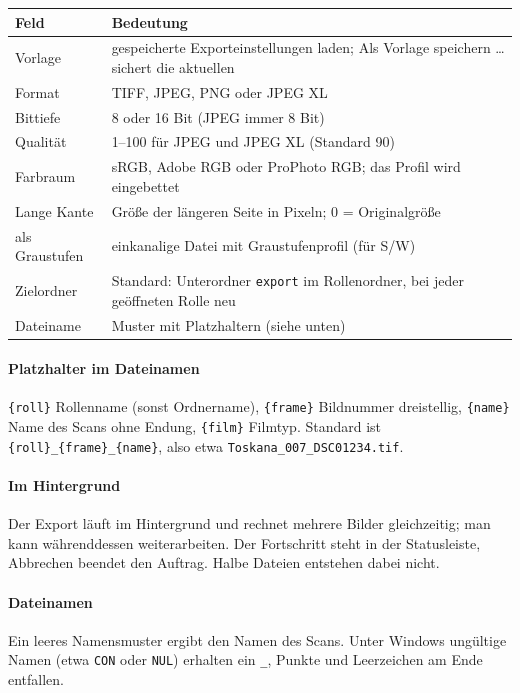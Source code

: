 \documentclass[a4paper,11pt,parskip=half,DIV=12]{scrartcl}
\newcommand{\menu}[1]{\textsf{#1}}                    %
\newcommand{\datei}[1]{\texttt{#1}}                   %
\begin{document}
\begin{center}
\begin{tabularx}{\textwidth}{@{}lX@{}}
  \toprule
  Feld & Bedeutung \\
  \midrule
  Vorlage     & gespeicherte Exporteinstellungen laden; \menu{Als Vorlage speichern …} sichert
                die aktuellen \\
  Format      & TIFF, JPEG, PNG oder JPEG XL \\
  Bittiefe    & 8 oder 16 Bit (JPEG immer 8 Bit) \\
  Qualität    & 1--100 für JPEG und JPEG XL (Standard 90) \\
  Farbraum    & sRGB, Adobe RGB oder ProPhoto RGB; das Profil wird eingebettet \\
  Lange Kante & Größe der längeren Seite in Pixeln; 0 = Originalgröße \\
  als Graustufen & einkanalige Datei mit Graustufenprofil (für S/W) \\
  Zielordner  & Standard: Unterordner \datei{export} im Rollenordner, bei jeder geöffneten
                Rolle neu \\
  Dateiname   & Muster mit Platzhaltern (siehe unten) \\
  \bottomrule
\end{tabularx}
\end{center}

\paragraph{Platzhalter im Dateinamen} \datei{\{roll\}} Rollenname (sonst Ordnername),
\datei{\{frame\}} Bildnummer dreistellig, \datei{\{name\}} Name des Scans ohne Endung,
\datei{\{film\}} Filmtyp. Standard ist \datei{\{roll\}\_\{frame\}\_\{name\}}, also etwa
\datei{Toskana\_007\_DSC01234.tif}.

\paragraph{Im Hintergrund} Der Export läuft im Hintergrund und rechnet mehrere Bilder
gleichzeitig; man kann währenddessen weiterarbeiten. Der Fortschritt steht in der Statusleiste,
\menu{Abbrechen} beendet den Auftrag. Halbe Dateien entstehen dabei nicht.

\paragraph{Dateinamen} Ein leeres Namensmuster ergibt den Namen des Scans. Unter Windows
ungültige Namen (etwa \datei{CON} oder \datei{NUL}) erhalten ein \datei{\_}, Punkte und
Leerzeichen am Ende entfallen.
\end{document}
